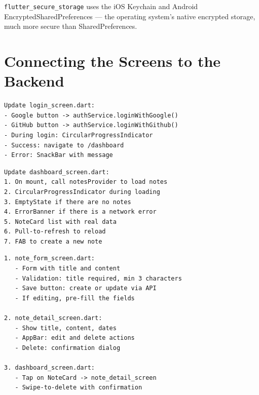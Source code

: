\begin{notebox}
\texttt{flutter\_secure\_storage} uses the iOS Keychain and Android EncryptedSharedPreferences --- the operating system's native encrypted storage, much more secure than SharedPreferences.
\end{notebox}

\section{Connecting the Screens to the Backend}

\begin{praticabox}[title={Hands-on --- Working login}]
\begin{lstlisting}[language={}]
Update login_screen.dart:
- Google button -> authService.loginWithGoogle()
- GitHub button -> authService.loginWithGithub()
- During login: CircularProgressIndicator
- Success: navigate to /dashboard
- Error: SnackBar with message
\end{lstlisting}
\end{praticabox}

\begin{praticabox}[title={Hands-on --- Dashboard with real data}]
\begin{lstlisting}[language={}]
Update dashboard_screen.dart:
1. On mount, call notesProvider to load notes
2. CircularProgressIndicator during loading
3. EmptyState if there are no notes
4. ErrorBanner if there is a network error
5. NoteCard list with real data
6. Pull-to-refresh to reload
7. FAB to create a new note
\end{lstlisting}
\end{praticabox}

\begin{praticabox}[title={Hands-on --- Full CRUD}]
\begin{lstlisting}[language={}]
1. note_form_screen.dart:
   - Form with title and content
   - Validation: title required, min 3 characters
   - Save button: create or update via API
   - If editing, pre-fill the fields

2. note_detail_screen.dart:
   - Show title, content, dates
   - AppBar: edit and delete actions
   - Delete: confirmation dialog

3. dashboard_screen.dart:
   - Tap on NoteCard -> note_detail_screen
   - Swipe-to-delete with confirmation
\end{lstlisting}
\end{praticabox}

